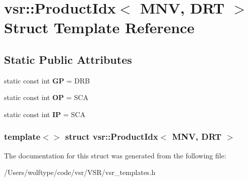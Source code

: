 \hypertarget{structvsr_1_1_product_idx_3_01_m_n_v_00_01_d_r_t_01_4}{\section{vsr\-:\-:Product\-Idx$<$ M\-N\-V, D\-R\-T $>$ Struct Template Reference}
\label{structvsr_1_1_product_idx_3_01_m_n_v_00_01_d_r_t_01_4}
}
\subsection*{Static Public Attributes}
\begin{DoxyCompactItemize}
\item 
\hypertarget{structvsr_1_1_product_idx_3_01_m_n_v_00_01_d_r_t_01_4_a24932ea25a551a63835d7e0f8ab7fd59}{static const int {\bfseries G\-P} = D\-R\-B}\label{structvsr_1_1_product_idx_3_01_m_n_v_00_01_d_r_t_01_4_a24932ea25a551a63835d7e0f8ab7fd59}

\item 
\hypertarget{structvsr_1_1_product_idx_3_01_m_n_v_00_01_d_r_t_01_4_a5742171e1b0162cef11ca001ced9bbec}{static const int {\bfseries O\-P} = S\-C\-A}\label{structvsr_1_1_product_idx_3_01_m_n_v_00_01_d_r_t_01_4_a5742171e1b0162cef11ca001ced9bbec}

\item 
\hypertarget{structvsr_1_1_product_idx_3_01_m_n_v_00_01_d_r_t_01_4_a4f9ede87d9402cbeda4960c4aac70b93}{static const int {\bfseries I\-P} = S\-C\-A}\label{structvsr_1_1_product_idx_3_01_m_n_v_00_01_d_r_t_01_4_a4f9ede87d9402cbeda4960c4aac70b93}

\end{DoxyCompactItemize}
\subsubsection*{template$<$$>$ struct vsr\-::\-Product\-Idx$<$ M\-N\-V, D\-R\-T $>$}



The documentation for this struct was generated from the following file\-:\begin{DoxyCompactItemize}
\item 
/\-Users/wolftype/code/vsr/\-V\-S\-R/vsr\-\_\-templates.\-h\end{DoxyCompactItemize}
